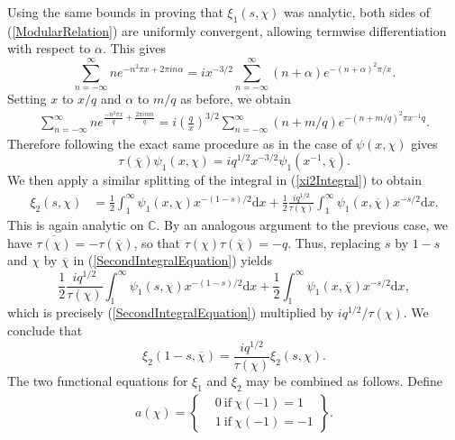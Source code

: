 Using the same bounds in proving that $\xi_1(s, \chi)$ was analytic, both sides of (\ref{ModularRelation}) are uniformly convergent, allowing termwise differentiation with respect to $\alpha$. This gives
\begin{equation}
    \sum_{n=-\infty}^{\infty} n e^{-n^{2}\pi x + 2\pi i n \alpha} = i x^{-3/2} \sum_{n=-\infty}^{\infty}(n + \alpha) e^{-(n + \alpha)^{2}\pi/x}. \nonumber
\end{equation}
Setting $x$ to $x/q$ and $\alpha$ to $m/q$ as before, we obtain
\begin{align}
    \sum_{n=-\infty}^{\infty} n e^{\frac{-n^{2}\pi x}{q} + \frac{2\pi i n m}{q}} = i\left( \frac{q}{x} \right)^{3/2} \sum_{n=-\infty}^{\infty} (n + m/q) e^{-(n + m/q)^{2}\pi x^{-1} q}. \nonumber
\end{align}
Therefore following the exact same procedure as in the case of $\psi(x, \chi)$ gives
\begin{equation}
    \tau(\overline{\chi}) \psi_1(x, \chi) = i q^{1/2} x^{-3/2} \psi_{1}(x^{-1}, \overline{\chi}). \nonumber
\end{equation}
We then apply a similar splitting of the integral in (\ref{xi2Integral}) to obtain
\begin{align}
\label{SecondIntegralEquation}
    \xi_2(s, \chi) &= \frac12 \int_{1}^{\infty}\psi_1(x, \chi) x^{-(1 - s)/2} \mathrm{d} x + \frac12 \frac{i q^{1/2}}{\tau(\overline{\chi})}\int_{1}^{\infty} \psi_1(x, \overline{\chi})x^{-s/2} \mathrm{d} x.  
\end{align}
This is again analytic on $\mathbb{C}$. By an analogous argument to the previous case, we have $\overline{\tau(\chi)} = -\tau(\overline{\chi})$, so that $\tau(\chi)\tau(\overline{\chi}) = -q$. Thus, replacing $s$ by $1-s$ and $\chi$ by $\overline{\chi}$ in (\ref{SecondIntegralEquation}) yields
\begin{equation}
    \frac12 \frac{i q^{1/2}}{\tau(\chi)}\int_{1}^{\infty}\psi_1(s, \chi) x^{-(1 - s)/2} \mathrm{d} x + \frac12 \int_{1}^{\infty} \psi_1(x, \overline{\chi})x^{-s/2} \mathrm{d} x, \nonumber
\end{equation}
which is precisely (\ref{SecondIntegralEquation}) multiplied by $i q^{1/2}/\tau(\chi)$. We conclude that
\begin{equation}
    \xi_{2}(1-s, \overline{\chi}) = \frac{i q^{1/2}}{\tau(\chi)} \xi_{2}(s, \chi). \nonumber
\end{equation}
The two functional equations for $\xi_1$ and $\xi_2$ may be combined as follows. Define 
\begin{align}
a(\chi) = \left\{
    \begin{array}{ll}
         &  0 \ \textrm{if} \ \chi(-1) = 1\\
         &  1 \ \textrm{if} \ \chi(-1) = -1
    \end{array}
    \right\}.
    \nonumber
\end{align}
